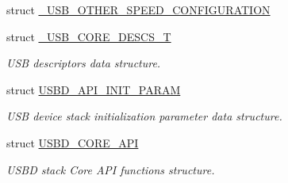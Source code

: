 \begin{DoxyCompactItemize}
\item 
struct \hyperlink{struct__USB__OTHER__SPEED__CONFIGURATION}{\-\_\-\-U\-S\-B\-\_\-\-O\-T\-H\-E\-R\-\_\-\-S\-P\-E\-E\-D\-\_\-\-C\-O\-N\-F\-I\-G\-U\-R\-A\-T\-I\-O\-N}
\item 
struct \hyperlink{struct__USB__CORE__DESCS__T}{\-\_\-\-U\-S\-B\-\_\-\-C\-O\-R\-E\-\_\-\-D\-E\-S\-C\-S\-\_\-\-T}
\begin{DoxyCompactList}\small\item\em U\-S\-B descriptors data structure. \end{DoxyCompactList}\item 
struct \hyperlink{structUSBD__API__INIT__PARAM}{U\-S\-B\-D\-\_\-\-A\-P\-I\-\_\-\-I\-N\-I\-T\-\_\-\-P\-A\-R\-A\-M}
\begin{DoxyCompactList}\small\item\em U\-S\-B device stack initialization parameter data structure. \end{DoxyCompactList}\item 
struct \hyperlink{structUSBD__CORE__API}{U\-S\-B\-D\-\_\-\-C\-O\-R\-E\-\_\-\-A\-P\-I}
\begin{DoxyCompactList}\small\item\em U\-S\-B\-D stack Core A\-P\-I functions structure. \end{DoxyCompactList}\end{DoxyCompactItemize}
